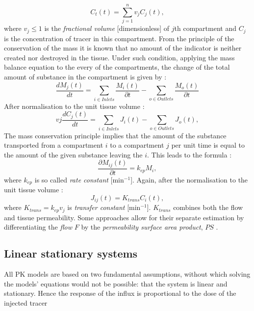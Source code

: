 \begin{equation}
C_t(t) = \sum_{j=1}^{n}v_jC_j(t),
\label{eq:pk3}
\end{equation}
where $v_j\leq1$ is the \textit{fractional volume} [dimensionless] of $j$th compartment and $C_j$ is the concentration of tracer in this compartment. 
From the principle of the conservation of the mass it is known that no amount of the indicator is neither created nor destroyed in the tissue. Under such condition, applying the mass balance equation to the every of the compartments, the change of the total amount of substance in the compartment is given by \cite{thesis}:
\begin{equation}
\frac{dM_j(t)}{dt} = \sum_{i \in Inlets}\frac{M_i(t)}{\partial t}-\sum_{o \in Outlets}\frac{M_o(t)}{\partial t} 
\label{eq:pk4}
\end{equation}
After normalisation to the unit tissue volume \cite{thesis}:
\begin{equation}
vj\frac{dC_j(t)}{dt} = \sum_{i \in Inlets}J_i(t)-\sum_{o \in Outlets}J_o(t) ,
\label{eq:pk5}
\end{equation}
The mass conservation principle implies that the amount of the substance transported from a compartment $i$ to a compartment $j$ per unit time is equal to the amount of the given substance leaving the $i$. This leads to the formula \cite{thesis}:
\begin{equation}
\frac{\partial M_{ij}(t)}{\partial t} = k_{ep}M_i,
\label{eq:pk6}
\end{equation}
where $k_{ep}$ is so called \textit{rate constant} [min$^{-1}$]. Again, after the normalisation to the unit tissue volume \cite{thesis}:
\begin{equation}
J_{ij}(t) = K_{trans}C_i(t),
\label{eq:pk7}
\end{equation}
where $K_{trans}=k_{ep}v_j$ is \textit{transfer constant} [min$^{-1}$]. $K_{trans}$ combines both the flow and tissue permeability. Some approaches allow for their separate estimation by differentiating the \textit{flow} $F$ by the \textit{permeability surface area product}, $PS$ \cite{thesis}. 

\subsection{Linear stationary systems}
All PK models are based on two fundamental assumptions, without which solving the models' equations would not be possible: that the system is linear and stationary. Hence the response of the influx is proportional to the dose of the injected tracer \cite{thesis, sourbron2011scope} 

